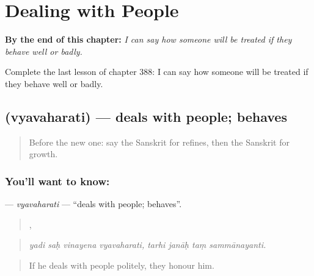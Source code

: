 
\chapter{Dealing with People}
\label{ch:sa-dealing-with-people}

\begin{chapteropening}
\textbf{By the end of this chapter:} \emph{I can say how someone will be treated if they behave well or badly.}

Complete the last lesson of chapter 388: I can say how someone will be treated if they behave well or badly.
\end{chapteropening}

\section[\texorpdfstring{\sk{व्यवहरति} (vyavaharati)}{व्यवहरति (vyavaharati)}]{ (vyavaharati) — deals with people; behaves}

\label{lesson:SA-C388-vyavaharati}



\begin{quote}
Before the new one: say the Sanskrit for refines, then the Sanskrit for growth.
\end{quote}

\subsection*{You'll want to know: }
\textbf{} — \emph{vyavaharati} — \textquotedblleft{}deals with people; behaves\textquotedblright{}.

\begin{quote}
   ,    
\end{quote}

\begin{quote}
\emph{yadi saḥ vinayena vyavaharati, tarhi janāḥ taṃ sammānayanti.}
\end{quote}

\begin{quote}
If he deals with people politely, they honour him.
\end{quote}

